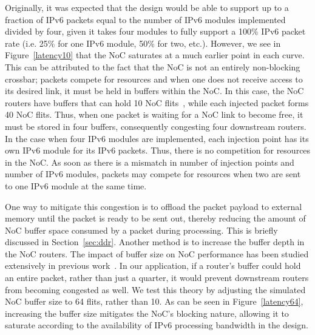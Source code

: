 Originally, it was expected that the design would be able to support up to a fraction of IPv6 packets equal to the number of IPv6 modules implemented divided by four, given it takes four modules to fully support a 100\% IPv6 packet rate (i.e. 25\% for one IPv6 module, 50\% for two, etc.).
However, we see in Figure~\ref{latency10} that the NoC saturates at a much earlier point in each curve.
This can be attributed to the fact that the NoC is not an entirely non-blocking crossbar; packets compete for resources and when one does not receive access to its desired link, it must be held in buffers within the NoC.
In this case, the NoC routers have buffers that can hold 10 NoC flits~\cite{abdelfattah2015take}, while each injected packet forms 40 NoC flits.
Thus, when one packet is waiting for a NoC link to become free, it must be stored in four buffers, consequently congesting four downstream routers.
In the case when four IPv6 modules are implemented, each injection point has its own IPv6 module for its IPv6 packets.
Thus, there is no competition for resources in the NoC.
As soon as there is a mismatch in number of injection points and number of IPv6 modules, packets may compete for resources when two are sent to one IPv6 module at the same time.

One way to mitigate this congestion is to offload the packet payload to external memory until the packet is ready to be sent out, thereby reducing the amount of NoC buffer space consumed by a packet during processing.
This is briefly discussed in Section~\ref{sec:ddr}.
Another method is to increase the buffer depth in the NoC routers.
The impact of buffer size on NoC performance has been studied extensively in previous work~\cite{coenen2006buffer}.
In our application, if a router's buffer could hold an entire packet, rather than just a quarter, it would prevent downstream routers from becoming congested as well.
We test this theory by adjusting the simulated NoC buffer size to 64 flits, rather than 10.
As can be seen in Figure~\ref{latency64}, increasing the buffer size mitigates the NoC's blocking nature, allowing it to saturate according to the availability of IPv6 processing bandwidth in the design.

\vspace{-0.1cm}

